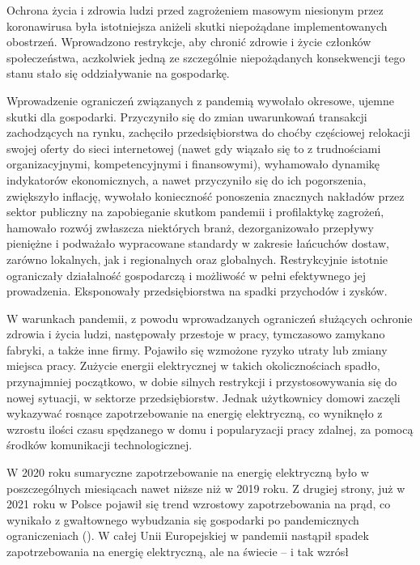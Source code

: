 \documentclass[polish, twoside, 12pt, a4paper]{article}
\theoremstyle{definition}
\theoremstyle{plain}
\theoremstyle{remark}
\begin{document}
Ochrona życia i zdrowia ludzi przed zagrożeniem masowym niesionym przez koronawirusa była istotniejsza aniżeli skutki niepożądane implementowanych obostrzeń. Wprowadzono restrykcje, aby chronić zdrowie i życie członków społeczeństwa, aczkolwiek jedną ze szczególnie niepożądanych konsekwencji tego stanu stało się oddziaływanie na gospodarkę.  

Wprowadzenie ograniczeń związanych z pandemią wywołało okresowe, ujemne skutki dla gospodarki. Przyczyniło się do zmian uwarunkowań transakcji zachodzących na rynku, zachęciło przedsiębiorstwa do choćby częściowej relokacji swojej oferty do sieci internetowej (nawet gdy wiązało się to z trudnościami organizacyjnymi, kompetencyjnymi i finansowymi), wyhamowało dynamikę indykatorów ekonomicznych, a nawet przyczyniło się do ich pogorszenia, zwiększyło inflację, wywołało konieczność ponoszenia znacznych nakładów przez sektor publiczny na zapobieganie skutkom pandemii i profilaktykę zagrożeń, hamowało rozwój zwłaszcza niektórych branż, dezorganizowało przepływy pieniężne i podważało wypracowane standardy w zakresie łańcuchów dostaw, zarówno lokalnych, jak i regionalnych oraz globalnych. Restrykcyjnie istotnie ograniczały działalność gospodarczą i możliwość w pełni efektywnego jej prowadzenia. Eksponowały przedsiębiorstwa na spadki przychodów i zysków. 

W warunkach pandemii, z powodu wprowadzanych ograniczeń służących ochronie zdrowia i życia ludzi, następowały przestoje w pracy, tymczasowo zamykano fabryki, a także inne firmy. Pojawiło się wzmożone ryzyko utraty lub zmiany miejsca pracy. Zużycie energii elektrycznej w takich okolicznościach spadło, przynajmniej początkowo, w dobie silnych restrykcji i przystosowywania się do nowej sytuacji, w sektorze przedsiębiorstw. Jednak użytkownicy domowi zaczęli wykazywać rosnące zapotrzebowanie na energię elektryczną, co wyniknęło z wzrostu ilości czasu spędzanego w domu i popularyzacji pracy zdalnej, za pomocą środków komunikacji technologicznej. 

W 2020 roku sumaryczne zapotrzebowanie na energię elektryczną było w poszczególnych miesiącach nawet niższe niż w 2019 roku. Z drugiej strony, już w 2021 roku w Polsce pojawił się trend wzrostowy zapotrzebowania na prąd, co wynikało z gwałtownego wybudzania się gospodarki po pandemicznych ograniczeniach (\cite{smyk2021}). W całej Unii Europejskiej w pandemii nastąpił spadek zapotrzebowania na energię elektryczną, ale na świecie – i tak wzrósł %

\clearpage
\end{document}
